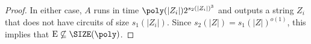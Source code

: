 \begin{proof}
In either case, $A$ runs in time $\poly(|Z_i|)2^{s_2(|Z_i|)^3}$ and outputs a string $Z_i$ that does not have circuits of size $s_1(|Z_i|)$. Since $s_2(|Z|)=s_1(|Z|)^{o(1)}$, this implies that $\mathrm E\not\subseteq\SIZE(\poly)$.
\end{proof}
